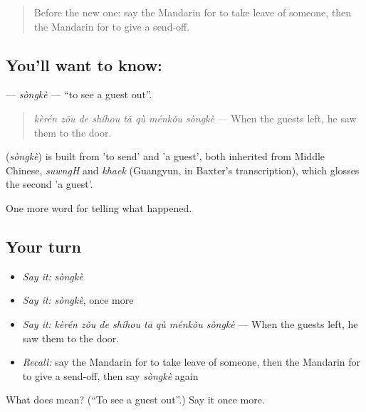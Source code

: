 \begin{quote}
Before the new one: say the Mandarin for to take leave of someone, then the Mandarin for to give a send-off.
\end{quote}

\subsection*{You'll want to know: }
\textbf{} — \emph{sòngkè} — \textquotedblleft{}to see a guest out\textquotedblright{}.

\begin{quote}
\textbf{} \emph{kèrén zǒu de shíhou tā qù ménkǒu sòngkè} — When the guests left, he saw them to the door.
\end{quote}

\begin{cousinweb}
\textbf{} (\emph{sòngkè}) is built from  'to send' and  'a guest', both inherited from Middle Chinese, \emph{suwngH} and \emph{khaek} (Guangyun, in Baxter's transcription), which glosses the second 'a guest'.
\end{cousinweb}

\begin{grammarlens}[title={What you've built}]
One more word for telling what happened.
\end{grammarlens}

\subsection*{Your turn}
\begin{itemize}
\raggedright
  \item \emph{Say it:} \emph{sòngkè}
  \item \emph{Say it:} \emph{sòngkè}, once more
  \item \emph{Say it:} \emph{kèrén zǒu de shíhou tā qù ménkǒu sòngkè} — When the guests left, he saw them to the door.
  \item \emph{Recall:} say the Mandarin for to take leave of someone, then the Mandarin for to give a send-off, then say \emph{sòngkè} again
\end{itemize}

\begin{tcolorbox}[breakable,colback=teal!4,colframe=teal!35!black,title={Before you move on}]
What does  mean? (\textquotedblleft{}To see a guest out\textquotedblright{}.) Say it once more.
\end{tcolorbox}

